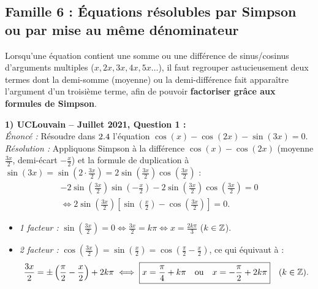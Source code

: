 \subsection{Famille 6 : Équations résolubles par Simpson ou par mise au même dénominateur}

Lorsqu'une équation contient une somme ou une différence de sinus/cosinus d'arguments multiples ($x, 2x, 3x, 4x, 5x\dots$), il faut regrouper astucieusement deux termes dont la demi-somme (moyenne) ou la demi-différence fait apparaître l'argument d'un troisième terme, afin de pouvoir \textbf{factoriser grâce aux formules de Simpson}.

\begin{exemple}
\textbf{1) UCLouvain -- Juillet 2021, Question 1 :}\\
\emph{Énoncé :} Résoudre dans $2.4$ l'équation $\cos(x) - \cos(2x) - \sin(3x) = 0$.\\
\emph{Résolution :} Appliquons Simpson à la différence $\cos(x) - \cos(2x)$ (moyenne $\frac{3x}{2}$, demi-écart $-\frac{x}{2}$) et la formule de duplication à $\sin(3x) = \sin\left(2\cdot\frac{3x}{2}\right) = 2\sin\left(\frac{3x}{2}\right)\cos\left(\frac{3x}{2}\right)$ :
\begin{align*}
    -2\sin\left(\frac{3x}{2}\right)\sin\left(-\frac{x}{2}\right) - 2\sin\left(\frac{3x}{2}\right)\cos\left(\frac{3x}{2}\right) = 0 \\
    \iff 2\sin\left(\frac{3x}{2}\right)\left[\sin\left(\frac{x}{2}\right) - \cos\left(\frac{3x}{2}\right)\right] = 0.
\end{align*}
\begin{itemize}
    \item \emph{1 facteur :} $\sin\left(\frac{3x}{2}\right) = 0 \iff \frac{3x}{2} = k\pi \iff \boxed{x = \frac{2k\pi}{3}}$ ($k \in \mathbb{Z}$).
    \item \emph{2 facteur :} $\cos\left(\frac{3x}{2}\right) = \sin\left(\frac{x}{2}\right) = \cos\left(\frac{\pi}{2} - \frac{x}{2}\right)$, ce qui équivaut à :
    \[
        \frac{3x}{2} = \pm\left(\frac{\pi}{2} - \frac{x}{2}\right) + 2k\pi \iff \boxed{x = \frac{\pi}{4} + k\pi \quad \text{ou} \quad x = -\frac{\pi}{2} + 2k\pi} \quad (k\in\mathbb{Z}).
    \]
\end{itemize}


\end{exemple}
